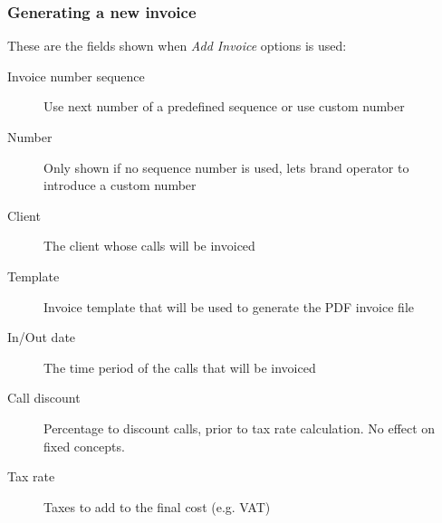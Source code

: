 \documentclass[letterpaper,10pt,english]{sphinxmanual}
\begin{document}
\subsubsection{Generating a new invoice}
\label{administration_portal/brand/invoicing/invoices:generating-a-new-invoice}
These are the fields shown when \emph{Add Invoice} options is used:
\begin{description}
\item[{Invoice number sequence}] \leavevmode{}\label{administration_portal/brand/invoicing/invoices:term-invoice-number-sequence}
Use next number of a predefined sequence or use custom number

\item[{Number}] \leavevmode{}\label{administration_portal/brand/invoicing/invoices:term-number}
Only shown if no sequence number is used, lets brand operator to introduce a custom number

\item[{Client}] \leavevmode{}\label{administration_portal/brand/invoicing/invoices:term-client}
The client whose calls will be invoiced

\item[{Template}] \leavevmode{}\label{administration_portal/brand/invoicing/invoices:term-template}
Invoice template that will be used to generate the PDF invoice file

\item[{In/Out date}] \leavevmode{}\label{administration_portal/brand/invoicing/invoices:term-in-out-date}
The time period of the calls that will be invoiced

\item[{Call discount}] \leavevmode{}\label{administration_portal/brand/invoicing/invoices:term-call-discount}
Percentage to discount calls, prior to tax rate calculation. No effect on fixed concepts.

\item[{Tax rate}] \leavevmode{}\label{administration_portal/brand/invoicing/invoices:term-tax-rate}
Taxes to add to the final cost (e.g. VAT)

\end{description}
\end{document}
